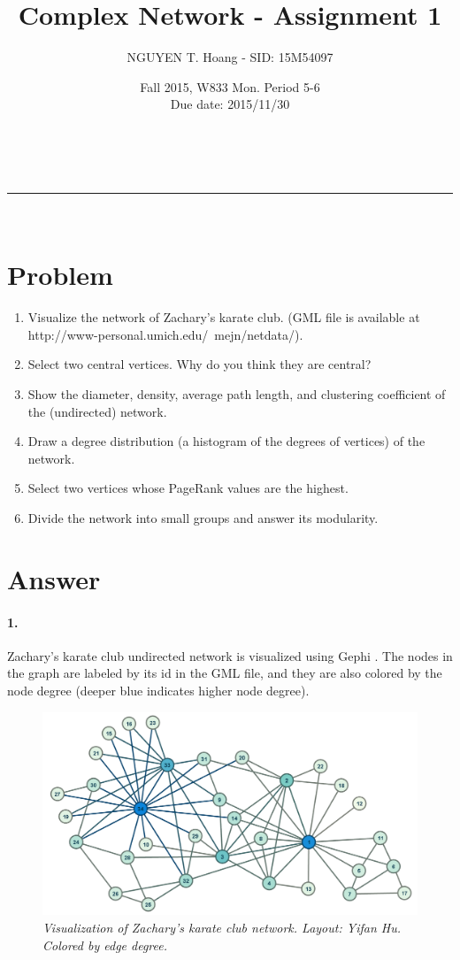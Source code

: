 \documentclass[a4paper,12pt]{article}
\makeatletter
\newcommand{\linia}{\rule{\linewidth}{0.5pt}}
\renewcommand{\maketitle} {%
\begin{center}
\vspace{2ex}
{\huge \textsc{\@title}}
\vspace{1ex}
\\
\linia\\
\@author \hfill \@date
\vspace{4ex}
\end{center}
}
\makeatother
\begin{document}

\title{Complex Network - Assignment 1}

\author{NGUYEN T. Hoang - SID: 15M54097}

\date{Fall 2015, W833 Mon. Period 5-6 \\ \hfill Due date: 2015/11/30}

\maketitle

\vfill
\section*{Problem}
\noindent
\begin{enumerate}
    \item Visualize the network of Zachary's karate club. (GML file is available at http://www-personal.umich.edu/~mejn/netdata/).
    \item Select two central vertices. Why do you think they are central?
    \item Show the diameter, density, average path length, and clustering coefficient of the (undirected) network.
    \item Draw a degree distribution (a histogram of the degrees of vertices) of the network.
    \item Select two vertices whose PageRank values are the highest.
    \item Divide the network into small groups and answer its modularity.
\end{enumerate}
\vfill
\pagebreak
\section*{Answer}
\noindent
\paragraph{1.} Zachary's karate club undirected network is visualized using Gephi \cite{gephi}. The nodes in the graph are labeled by its id in the GML file, and they are also colored by the node degree (deeper blue indicates higher node degree).

\begin{figure}[h]
    \includegraphics[width=\textwidth]{karate_viz.PNG}
    \caption{\emph{Visualization of Zachary's karate club network. Layout: Yifan Hu. Colored by edge degree.}}
    \label{fig:net}
\end{figure}
\end{document}
